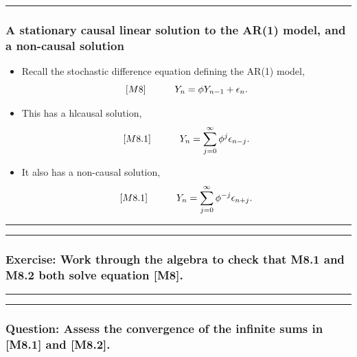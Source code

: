 \documentclass[]{article}
\begin{document}
\begin{center}\rule{0.5\linewidth}{\linethickness}\end{center}

\subsubsection{A stationary causal linear solution to the AR(1) model,
and a non-causal
solution}\label{a-stationary-causal-linear-solution-to-the-ar1-model-and-a-non-causal-solution}

\begin{itemize}
\item Recall the stochastic difference equation defining the AR(1) model,
  $${[}M8{]}\quad\quad\quad Y_n = \phi Y_{n-1}+\epsilon_n. $$
\item
  This has a hl{causal solution}, $${[}M8.1{]}
  \quad\quad\quad Y_n = \sum_{j=0}^\infty \phi^j\epsilon_{n-j}. $$
\item
  It also has a non-causal solution, $${[}M8.1{]}
  \quad\quad\quad Y_n = \sum_{j=0}^\infty \phi^{-j}\epsilon_{n+j}. $$
\end{itemize}

\begin{center}\rule{0.5\linewidth}{\linethickness}\end{center}

\begin{center}\rule{0.5\linewidth}{\linethickness}\end{center}

\subsubsection{Exercise: Work through the algebra to check that M8.1 and
M8.2 both solve equation
{[}M8{]}.}\label{exercise-work-through-the-algebra-to-check-that-m8.1-and-m8.2-both-solve-equation-m8.}

\begin{center}\rule{0.5\linewidth}{\linethickness}\end{center}

\begin{center}\rule{0.5\linewidth}{\linethickness}\end{center}

\subsubsection{Question: Assess the convergence of the infinite sums in
{[}M8.1{]} and
{[}M8.2{]}.}\label{question-assess-the-convergence-of-the-infinite-sums-in-m8.1-and-m8.2.}
\end{document}
